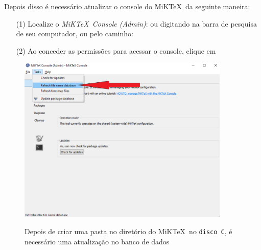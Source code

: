 \documentclass[a4paper]{article}
\begin{document}
\begin{center}
\end{center}

Depois disso é necessário atualizar o console do MiK\TeX\ da seguinte maneira:
\begin{enumerate}
	\item[(1)] Localize o \emph{MiK\TeX\ Console (Admin)}: ou digitando na barra de pesquisa de seu computador, ou pelo caminho:
	\begin{center}\end{center}
	\item[(2)] Ao conceder as permissões para acessar o console, clique em 
	\begin{center}\end{center}
\end{enumerate}

\begin{figure}[!htbp]
\centering
\caption{Depois de criar uma pasta no diretório do MiK\TeX\, no \texttt{disco C}, é necessário uma atualização no banco de dados}
\includegraphics[width=0.9\textwidth]{MiKTeX}
\label{fig:MiKTeX}
\end{figure}
\end{document}
